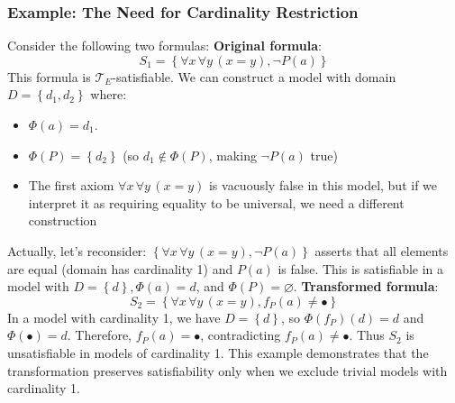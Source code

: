 \documentclass[a4paper]{article}
\theoremstyle{definition}
\begin{document}
\subsubsection{Example: The Need for Cardinality Restriction}
Consider the following two formulas:
\vspace{1em}
\noindent
\newline
\textbf{Original formula}:
\[
  S_1 = \left\{\forall x\, \forall y\, (x = y), \lnot P(a) \right\}
\]
This formula is \( \mathcal{T}_{E} \)-satisfiable. We can construct a model with domain \( D = \left\{d_1,d_2\right\} \) where:
\begin{itemize}
	\item \( \Phi(a) = d_1 \).
	\item \( \Phi(P) = \left\{ d_2 \right\} \) (so \( d_1 \notin \Phi(P) \), making \( \lnot P(a) \) true)
	\item The first axiom \( \forall x\, \forall y\, (x = y) \) is vacuously false in this model, but if we interpret it as 
		requiring equality to be universal, we need a different construction
\end{itemize}
Actually, let's reconsider: \( \left\{ \forall x\, \forall y\, (x = y), \lnot P(a) \right\} \) asserts that all elements are equal 
(domain has cardinality 1) and \( P(a) \) is false. This is satisfiable in a model with \( D = \left\{d\right\}, \Phi(a) = d \),
and \( \Phi(P) = \varnothing \).
\vspace{1em}
\noindent
\newline
\textbf{Transformed formula}:
\[
  S_2 = \left\{ \forall x\, \forall y\, (x = y), f_P(a) \neq \bullet \right\}
\]
In a model with cardinality 1, we have \( D = \left\{d\right\} \), so \( \Phi(f_P)(d) = d \) and \( \Phi(\bullet) = d \). Therefore,
\( f_P(a) = \bullet \), contradicting \( f_P(a) \neq \bullet \). Thus \( S_2 \) is unsatisfiable in models of cardinality 1.
\vspace{1em}
\noindent
\newline
This example demonstrates that the transformation preserves satisfiability only when we exclude trivial models with cardinality 1.
\end{document}
